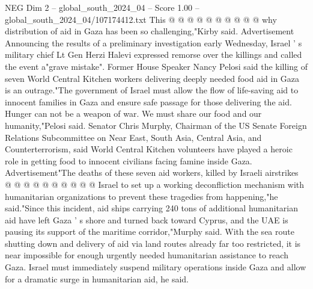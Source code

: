 \begin{textsample}{NEG Dim 2 – global\_south\_2024\_04 – Score 1.00 – global\_south\_2024\_04/107174412.txt}
This @ @ @ @ @ @ @ @ @ @ why distribution of aid in Gaza has been so challenging,"Kirby said.
Advertisement Announcing the results of a preliminary investigation early Wednesday, Israel ' s military chief Lt Gen Herzi Halevi expressed remorse over the killings and called the event a"grave mistake".
Former House Speaker Nancy Pelosi said the killing of seven World Central Kitchen workers delivering deeply needed food aid in Gaza is an outrage."The government of Israel must allow the flow of life-saving aid to innocent families in Gaza and ensure safe passage for those delivering the aid.
Hunger can not be a weapon of war.
We must share our food and our humanity,"Pelosi said.
Senator Chris Murphy, Chairman of the US Senate Foreign Relations Subcommittee on Near East, South Asia, Central Asia, and Counterterrorism, said World Central Kitchen volunteers have played a heroic role in getting food to innocent civilians facing famine inside Gaza.
Advertisement"The deaths of these seven aid workers, killed by Israeli airstrikes @ @ @ @ @ @ @ @ @ @ Israel to set up a working deconfliction mechanism with humanitarian organizations to prevent these tragedies from happening,"he said."Since this incident, aid ships carrying 240 tons of additional humanitarian aid have left Gaza ' s shore and turned back toward Cyprus, and the UAE is pausing its support of the maritime corridor,"Murphy said.
With the sea route shutting down and delivery of aid via land routes already far too restricted, it is near impossible for enough urgently needed humanitarian assistance to reach Gaza.
Israel must immediately suspend military operations inside Gaza and allow for a dramatic surge in humanitarian aid, he said.

\end{textsample}
